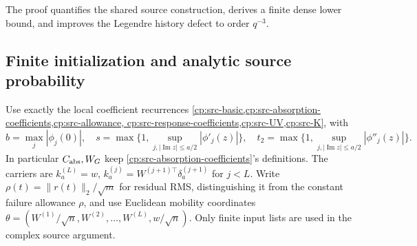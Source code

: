 The proof quantifies the shared source construction, derives a finite dense
lower bound, and improves the Legendre history defect to order $q^{-3}$.

\subsection{Finite initialization and analytic source probability}
\label{cp:poly:source-section}

Use exactly the local coefficient recurrences
\cref{cp:src-basic,cp:src-absorption-coefficients,cp:src-allowance,
cp:src-response-coefficients,cp:src-UV,cp:src-K}, with
\[
b=\max_j|\phi_j(0)|,\quad
s=\max\{1,\sup_{j,|\operatorname{Im}z|\le a/2}|\phi'_j(z)|\},\quad
t_2=\max\{1,\sup_{j,|\operatorname{Im}z|\le a/2}|\phi''_j(z)|\}.
\]
In particular $C_{\rm abs},W_G$ keep
\eqref{cp:src-absorption-coefficients}'s definitions.
The carriers are $k_a^{(L)}=w$,
$k_a^{(j)}=W^{(j+1)\top}\delta_a^{(j+1)}$ for $j<L$.
Write $\rho(t)=\|r(t)\|_2/\sqrt m$ for residual RMS, distinguishing it
from the constant failure allowance $\rho$, and use Euclidean mobility
coordinates
$\theta=(W^{(1)}/\sqrt n,W^{(2)},\ldots,W^{(L)},w/\sqrt n)$.
Only finite input lists are used in the complex source argument.

